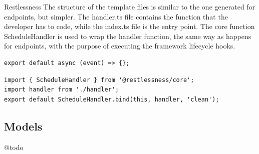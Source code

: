 \begin{chapter}{Restlessness}
    The structure of the template files is similar to the one generated for endpoints,
    but simpler. The handler.ts file contains the function that the developer has
    to code, while the index.ts file is the entry point.
    The core function ScheduleHandler is used to wrap the handler function, the same
    way as happens for endpoints, with the purpose of executing the framework lifecycle
    hooks.

    \begin{lstlisting}[caption=handler.ts content, label={lst:sched_handler_ts}]
export default async (event) => {};
    \end{lstlisting}

    \begin{lstlisting}[caption=index.ts content, label={lst:sched_index_ts}]
import { ScheduleHandler } from '@restlessness/core';
import handler from './handler';
export default ScheduleHandler.bind(this, handler, 'clean');
    \end{lstlisting}

    \subsection{Models}
    \label{subsec:models}
    @todo\\







\end{chapter}
